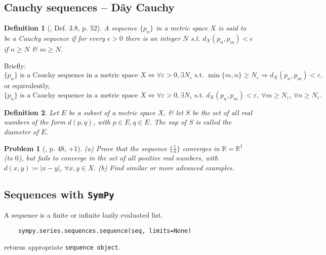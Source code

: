 \documentclass{article}
\newtheorem{definition}{Definition}
\newtheorem{problem}{Problem}
\begin{document}

\subsection{Cauchy sequences -- Dãy Cauchy}

\begin{definition}[\cite{Rudin1976}, Def. 3.8, p. 52]
	A sequence $\{p_n\}$ in a metric space $X$ is said to be a {\rm Cauchy sequence} if for every $\epsilon > 0$ there is an integer $N$ s.t. $d_X(p_n,p_m) < \epsilon$ if $n\ge N$ \& $m\ge N$.
\end{definition}
Briefly:
\begin{equation*}
	\{p_n\}\mbox{ is a Cauchy sequence in a metric space } X\Leftrightarrow\forall\varepsilon > 0,\exists N_\varepsilon\mbox{ s.t. }\min\{m,n\}\ge N_\varepsilon\Rightarrow d_X(p_n,p_m) < \varepsilon, 
\end{equation*}
or equivalently,
\begin{equation*}
	\{p_n\}\mbox{ is a Cauchy sequence in a metric space } X\Leftrightarrow\forall\varepsilon > 0,\exists N_\varepsilon\mbox{ s.t. }d_X(p_n,p_m) < \varepsilon,\ \forall m\ge N_\varepsilon,\,\forall n\ge N_\varepsilon.
\end{equation*}

\begin{definition}
	Let $E$ be a subset of a metric space $X$, \& let $S$ be the set of all real numbers of the form $d(p,q)$, with $p\in E,q\in E$. The sup of $S$ is called the {\rm diameter} of $E$.
\end{definition}

\begin{problem}[\cite{Rudin1976}, p. 48, +1]
	(a) Prove that the sequence $\{\frac{1}{n}\}$ converges in $\mathbb{R} = \mathbb{R}^1$ (to $0$), but fails to converge in the set of all positive real numbers, with $d(x,y)\coloneqq|x - y|$, $\forall x,y\in X$. (b) Find similar or more advanced examples.
\end{problem}


\subsection{Sequences with {\tt SymPy}}
A sequence is a finite or infinite lazily evaluated list.
\begin{verbatim}
	sympy.series.sequences.sequence(seq, limits=None)
\end{verbatim}
returns appropriate {\tt sequence object}.
\end{document}

